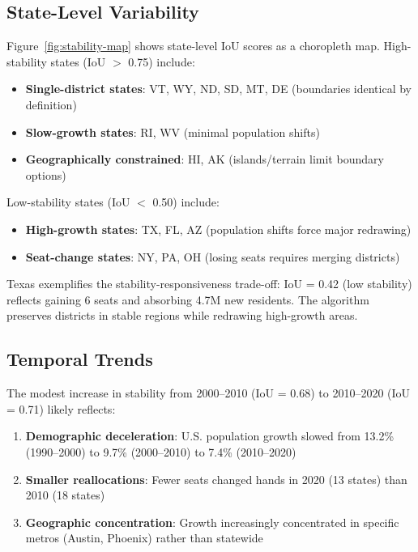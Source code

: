 \subsection{State-Level Variability}

Figure~\ref{fig:stability-map} shows state-level IoU scores as a choropleth map. High-stability states (IoU $>$ 0.75) include:

\begin{itemize}
    \item \textbf{Single-district states}: VT, WY, ND, SD, MT, DE (boundaries identical by definition)
    \item \textbf{Slow-growth states}: RI, WV (minimal population shifts)
    \item \textbf{Geographically constrained}: HI, AK (islands/terrain limit boundary options)
\end{itemize}

Low-stability states (IoU $<$ 0.50) include:

\begin{itemize}
    \item \textbf{High-growth states}: TX, FL, AZ (population shifts force major redrawing)
    \item \textbf{Seat-change states}: NY, PA, OH (losing seats requires merging districts)
\end{itemize}

Texas exemplifies the stability-responsiveness trade-off: IoU = 0.42 (low stability) reflects gaining 6 seats and absorbing 4.7M new residents. The algorithm preserves districts in stable regions while redrawing high-growth areas.

\subsection{Temporal Trends}

The modest increase in stability from 2000--2010 (IoU = 0.68) to 2010--2020 (IoU = 0.71) likely reflects:

\begin{enumerate}
    \item \textbf{Demographic deceleration}: U.S. population growth slowed from 13.2\% (1990--2000) to 9.7\% (2000--2010) to 7.4\% (2010--2020)
    \item \textbf{Smaller reallocations}: Fewer seats changed hands in 2020 (13 states) than 2010 (18 states)
    \item \textbf{Geographic concentration}: Growth increasingly concentrated in specific metros (Austin, Phoenix) rather than statewide
\end{enumerate}

